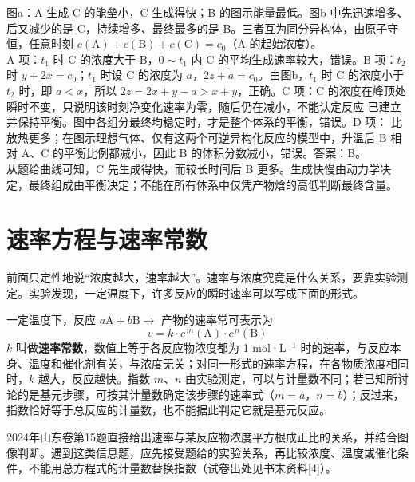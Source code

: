 \begin{liti}
\begin{center}
\end{center}
\tcblower
\silu 图a：A 生成 C 的能垒小，C 生成得快；B 的图示能量最低。图b 中先迅速增多、后又减少的是 C，持续增多、最终最多的是 B。三者互为同分异构体，由原子守恒，任意时刻 $c(\mathrm{A})+c(\mathrm{B})+c(\mathrm{C})=c_0$（A 的起始浓度）。\\
\jie A 项：$t_1$ 时 C 的浓度大于 B，$0\sim t_1$ 内 C 的平均生成速率较大，错误。B 项：$t_2$ 时 $y+2x=c_0$；$t_1$ 时设 C 的浓度为 $a$，$2z+a=c_0$。由图b，$t_1$ 时 C 的浓度小于 $t_2$ 时，即 $a<x$，所以 $2z=2x+y-a>x+y$，正确。C 项：C 的浓度在峰顶处瞬时不变，只说明该时刻净变化速率为零，随后仍在减小，不能认定反应  已建立并保持平衡。图中各组分最终均稳定时，才是整个体系的平衡，错误。D 项： 比  放热更多；在图示理想气体、仅有这两个可逆异构化反应的模型中，升温后 B 相对 A、C 的平衡比例都减小，因此 B 的体积分数减小，错误。答案：B。\\
\dianbo 从题给曲线可知，C 先生成得快，而较长时间后 B 更多。生成快慢由动力学决定，最终组成由平衡决定；不能在所有体系中仅凭产物焓的高低判断最终含量。
\end{liti}

\section{速率方程与速率常数}

前面只定性地说“浓度越大，速率越大”。速率与浓度究竟是什么关系，要靠实验测定。实验发现，一定温度下，许多反应的瞬时速率可以写成下面的形式。

\begin{gainian}[速率方程]
一定温度下，反应 $a\mathrm{A}+b\mathrm{B}\to$ 产物的速率常可表示为
\[v=k\cdot c^{\,m}(\mathrm{A})\cdot c^{\,n}(\mathrm{B})\]
$k$ 叫做\textbf{速率常数}，数值上等于各反应物浓度都为 1 mol·L$^{-1}$ 时的速率，与反应本身、温度和催化剂有关，与浓度无关；对同一形式的速率方程，在各物质浓度相同时，$k$ 越大，反应越快。指数 $m$、$n$ 由实验测定，可以与计量数不同；若已知所讨论的是基元步骤，可按其计量数确定该步骤的速率式（$m=a$，$n=b$）；反过来，指数恰好等于总反应的计量数，也不能据此判定它就是基元反应。
\end{gainian}

2024年山东卷第15题直接给出速率与某反应物浓度平方根成正比的关系，并结合图像判断。遇到这类信息题，应先接受题给的实验关系，再比较浓度、温度或催化条件，不能用总方程式的计量数替换指数（试卷出处见书末资料[4]）。


